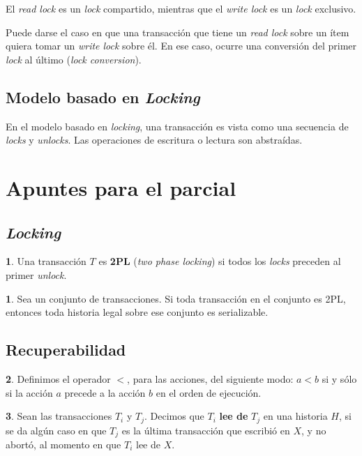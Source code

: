 \documentclass[english]{article}
\theoremstyle{definition}
\theoremstyle{definition}
\newtheorem*{defn*}{\protect\definitionname}
\providecommand{\definitionname}{Definición}
\newtheorem*{thm*}{\protect\theoremname}
\providecommand{\theoremname}{Teorema}
\begin{document}
El \emph{read lock} es un \emph{lock} compartido, mientras que el
\emph{write lock} es un \emph{lock} exclusivo.

Puede darse el caso en que una transacción que tiene un \emph{read lock} sobre
un ítem quiera tomar un \emph{write lock} sobre él. En ese caso, ocurre una
conversión del primer \emph{lock} al último (\emph{lock conversion}).

\subsection{Modelo basado en \emph{Locking}}

En el modelo basado en \emph{locking}, una transacción es vista como una
secuencia de \emph{locks} y \emph{unlocks}. Las operaciones de escritura o
lectura son abstraídas.


\newpage

\section{Apuntes para el parcial}

\subsection{\emph{Locking}}

\begin{defn*}
Una transacción $T$ es \textbf{2PL} (\emph{two phase locking}) si todos los
\emph{locks} preceden al primer \emph{unlock}.
\end{defn*}

\begin{thm*}
Sea un conjunto de transacciones. Si toda transacción en el conjunto es 2PL,
entonces toda historia legal sobre ese conjunto es serializable.
\end{thm*}

\subsection{Recuperabilidad}

\begin{defn*}
Definimos el operador $<$, para las acciones, del siguiente modo:
$a < b$ si y sólo si la acción $a$ precede a la acción $b$ en el orden de
ejecución.
\end{defn*}

\begin{defn*}
Sean las transacciones $T_i$ y $T_j$. Decimos que $T_i$ \textbf{lee de} $T_j$
en una historia $H$, si se da algún caso en que $T_j$ es la última transacción
que escribió en $X$, y no abortó, al momento en que $T_i$ lee de $X$.

\end{defn*}
\end{document}
